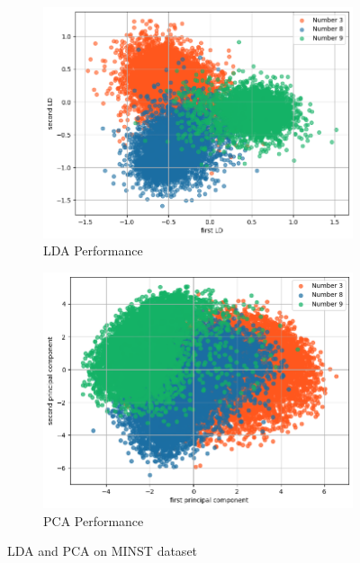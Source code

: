 \documentclass[12pt]{article}
\newcommand{\0}{\boldsymbol{0}}
\begin{document}
\begin{figure}[h!]
    \centering
    \begin{subfigure}[b]{0.45\textwidth}
        \centering
        \includegraphics[width=\textwidth]{../img/problem_1/LDA.png}
        \caption{LDA Performance}
        \label{fig:lda}
    \end{subfigure}
    \hfill
    \begin{subfigure}[b]{0.45\textwidth}
        \centering
        \includegraphics[width=\textwidth]{../img/problem_1/PCA.png}
        \caption{PCA Performance}
        \label{fig:pca}
    \end{subfigure}
    \label{fig:lda_vs_pca}
    \caption{LDA and PCA on MINST dataset}
\end{figure}
\end{document}
